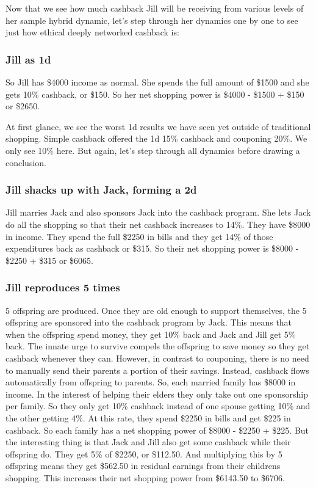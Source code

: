 \documentclass{article}%
\begin{document}
Now that we see how much cashback Jill will be receiving from various levels of her sample hybrid dynamic, let's step through her dynamics one by one to see just how ethical deeply networked cashback is:

\subsubsection{Jill as 1d}

    So Jill has \$4000 income as normal. She spends the full amount of \$1500 and she gets 10\% cashback, or \$150. So her net shopping power is \$4000 - \$1500 + \$150 or \$2650. 
    
At first glance, we see the worst 1d results we have seen yet outside of traditional shopping. Simple cashback offered the 1d 15\% cashback and couponing 20\%. We only see 10\% here. But again, let's step through all dynamics before drawing a conclusion.
    
\subsubsection{Jill shacks up with Jack, forming a 2d}  

    Jill marries Jack and also sponsors Jack into the cashback program. She lets Jack do all the shopping so that their net cashback increases to 14\%. They have \$8000 in income. They spend the full \$2250 in bills and they get 14\% of those expenditures back as cashback or \$315. So their net shopping power is \$8000 - \$2250 + \$315 or \$6065.

\subsubsection{Jill reproduces 5 times}
  
    5 offspring are produced. Once they are old enough to support themselves, the 5 offspring are sponsored into the cashback program by Jack. This means that when the offspring spend money, they get 10\% back and Jack and Jill get 5\% back. The innate urge to survive compels the offspring to save money so they get cashback whenever they can. However, in contrast to couponing, there is no need to manually send their parents a portion of their savings. Instead, cashback flows automatically from offspring to parents. So, each married family has \$8000 in income. In the interest of helping their elders they only take out one sponsorship per family. So they only get 10\% cashback instead of one spouse getting 10\% and the other getting 4\%. At this rate, they spend \$2250 in bills and get \$225 in cashback. So each family has a net shopping power of \$8000 - \$2250 + \$225. But the interesting thing is that Jack and Jill also get some cashback while their offspring do. They get 5\% of \$2250, or \$112.50. And multiplying this by 5 offspring means they get \$562.50 in residual earnings from their childrens shopping. This increases their net shopping power from \$6143.50 to \$6706. 
\end{document}

